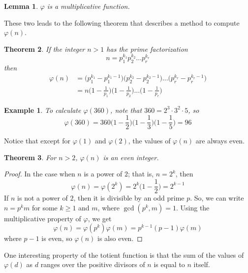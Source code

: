\documentclass{article}
\newtheorem{theorem}{Theorem}[section]
\newtheorem{lemma}[theorem]{Lemma}
\newtheorem{example}{Example}[section]
\theoremstyle{remark}
\theoremstyle{definition}
\begin{document}
\begin{lemma}
$\varphi$ is a multiplicative function. 
\end{lemma}

These two leads to the following theorem that describes a method to compute $\varphi(n)$. 

\begin{theorem}
If the integer $n>1$ has the prime factorization
\[n = p_1^{k_1} p_2^{k_2} ... p_r^{k_r}\]
then
\begin{align*}
    \varphi(n) & = \big( p_1^{k_1} - p_1^{k_1 - 1} \big) \big( p_2^{k_2} - p_2^{k_2 - 1} \big) ... \big( p_r^{k_r} - p_r^{k_r - 1} \big) \\
    & = n \bigg(1 - \frac{1}{p_1} \bigg) \bigg(1 - \frac{1}{p_2} \bigg) ... \bigg( 1 - \frac{1}{p_r}\bigg) 
\end{align*}
\end{theorem}

\begin{example}
To calculate $\varphi(360)$, note that $360 = 2^3 \cdot 3^2 \cdot 5$, so 
\[\varphi(360) = 360 \bigg(1 - \frac{1}{2} \bigg) \bigg( 1 - \frac{1}{3} \bigg) \bigg(1 - \frac{1}{5} \bigg) = 96\]
\end{example}

Notice that except for $\varphi(1)$ and $\varphi(2)$, the values of $\varphi(n)$ are always even. 

\begin{theorem}
For $n>2$, $\varphi(n)$ is an even integer. 
\end{theorem}
\begin{proof}
In the case when $n$ is a power of $2$; that is, $n = 2^k$, then 
\[\varphi(n) = \varphi(2^k) = 2^k \bigg(1 - \frac{1}{2} \bigg) = 2^{k-1}\]
If $n$ is not a power of $2$, then it is divisible by an odd prime $p$. So, we can write $n = p^k m$ for some $k \geq 1$ and $m$, where $\gcd(p^k, m) = 1$. Using the multiplicative property of $\varphi$, we get 
\[\varphi(n) = \varphi(p^k) \varphi(m) = p^{k-1} (p-1) \varphi(m)\]
where $p-1$ is even, so $\varphi(n)$ is also even. 
\end{proof}

One interesting property of the totient function is that the sum of the values of $\varphi(d)$ as $d$ ranges over the positive divisors of $n$ is equal to $n$ itself. 
\end{document}

